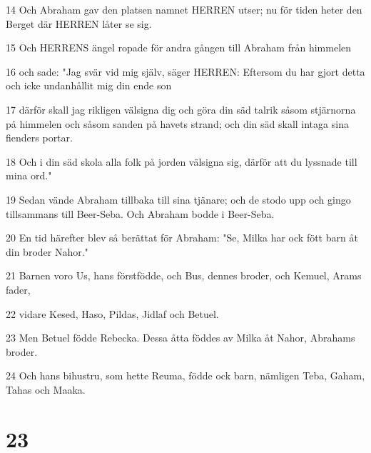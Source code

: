 \par 14 Och Abraham gav den platsen namnet HERREN utser; nu för tiden heter den Berget där HERREN låter se sig.
\par 15 Och HERRENS ängel ropade för andra gången till Abraham från himmelen
\par 16 och sade: "Jag svär vid mig själv, säger HERREN: Eftersom du har gjort detta och icke undanhållit mig din ende son
\par 17 därför skall jag rikligen välsigna dig och göra din säd talrik såsom stjärnorna på himmelen och såsom sanden på havets strand; och din säd skall intaga sina fienders portar.
\par 18 Och i din säd skola alla folk på jorden välsigna sig, därför att du lyssnade till mina ord."
\par 19 Sedan vände Abraham tillbaka till sina tjänare; och de stodo upp och gingo tillsammans till Beer-Seba. Och Abraham bodde i Beer-Seba.
\par 20 En tid härefter blev så berättat för Abraham: "Se, Milka har ock fött barn åt din broder Nahor."
\par 21 Barnen voro Us, hans förstfödde, och Bus, dennes broder, och Kemuel, Arams fader,
\par 22 vidare Kesed, Haso, Pildas, Jidlaf och Betuel.
\par 23 Men Betuel födde Rebecka. Dessa åtta föddes av Milka åt Nahor, Abrahams broder.
\par 24 Och hans bihustru, som hette Reuma, födde ock barn, nämligen Teba, Gaham, Tahas och Maaka.

\chapter{23}


